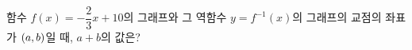 함수 $f(x)=-\dfrac{2}{3}x+10$의 그래프와 그 역함수 $y=f^{-1}(x)$의 그래프의 교점의 좌표가 $(a{,}\mkern3mu\mathopen{}b)$일 때, $a+b$의 값은?
